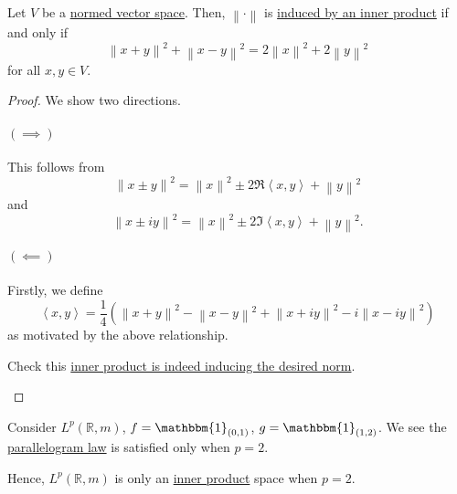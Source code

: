 \begin{theorem}\label{thm:parallelogram-law}
	Let \(V\) be a \hyperref[def:norm]{normed vector space}. Then, \(\left\lVert \cdot\right\rVert\) is
	\hyperref[def:induced-norm-from-inner-product]{induced by an inner product} if and only if
	\[
		\left\lVert x + y\right\rVert^2 + \left\lVert x-y\right\rVert^2 = 2\left\lVert x\right\rVert^2 + 2\left\lVert y\right\rVert^2
	\]
	for all \(x,y \in V\).
\end{theorem}
\begin{proof}
	We show two directions.
	\paragraph{\((\implies )\)}
	This follows from
	\[
		\left\lVert x \pm y\right\rVert^2 = \left\lVert x\right\rVert^2 \pm 2\Re \left< x,y \right> + \left\lVert y\right\rVert^2
	\]
	and
	\[
		\left\lVert x \pm iy\right\rVert ^2 = \left\lVert x\right\rVert^2 \pm 2 \Im \left< x,y \right> + \left\lVert y\right\rVert^2.
	\]
	\paragraph{\((\impliedby)\)}
	Firstly, we define
	\[
		\left< x,y \right> = \frac{1}{4}\left(\left\lVert x + y\right\rVert^2 - \left\lVert x - y\right\rVert^2 + \left\lVert x + iy\right\rVert^2 - i\left\lVert x - iy\right\rVert ^2\right)
	\]
	as motivated by the above relationship.
	\begin{exercise}
		Check this \hyperref[def:induced-norm-from-inner-product]{inner product is indeed inducing the desired norm}.
	\end{exercise}
\end{proof}

\begin{eg}
	Consider \(L^p(\mathbb{R},m)\), \(f = \mathbbm{1}_{(0,1)}\), \(g = \mathbbm{1}_{(1,2)}\). We see the \hyperref[thm:parallelogram-law]{parallelogram law}
	is satisfied only when \(p = 2\).

	\begin{remark}
		Hence, \(L^p(\mathbb{R},m)\) is only an \hyperref[def:inner-product]{inner product} space when \(p = 2\).
	\end{remark}
\end{eg}

